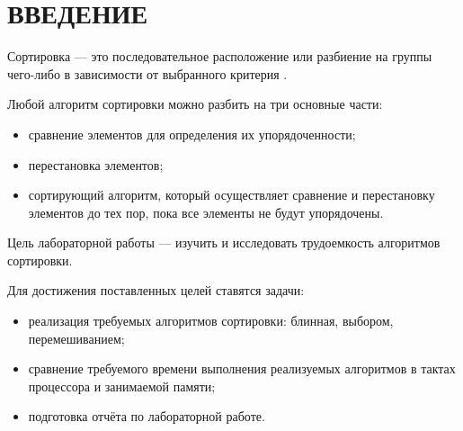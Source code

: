 \section*{ВВЕДЕНИЕ}

Сортировка --- это последовательное расположение или разбиение на группы чего-либо в зависимости от выбранного критерия \cite{вашинко2018блинная}.

Любой алгоритм сортировки можно разбить на три основные части:
\begin{itemize}
	\item сравнение элементов для определения их упорядоченности;
	\item перестановка элементов;
	\item сортирующий алгоритм, который осуществляет сравнение и перестановку элементов до тех пор, пока все элементы не будут упорядочены.
\end{itemize}
	
Цель лабораторной работы –-- изучить и исследовать трудоемкость алгоритмов сортировки.

Для достижения поставленных целей ставятся задачи:

\begin{itemize}
	\item реализация требуемых алгоритмов сортировки: блинная, выбором, перемешиванием;
	\item сравнение требуемого времени выполнения реализуемых алгоритмов в тактах процессора и занимаемой памяти;
	\item подготовка отчёта по лабораторной работе.
\end{itemize}